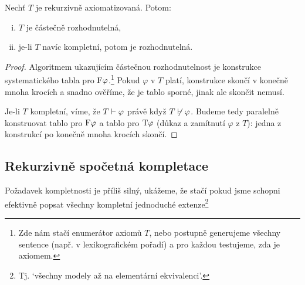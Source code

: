 \begin{proposition}
    Nechť $T$ je rekurzivně axiomatizovaná. Potom:
    \begin{enumerate}[(i)]
        \item $T$ je částečně rozhodnutelná,
        \item je-li $T$ navíc kompletní, potom je rozhodnutelná.
    \end{enumerate}
\end{proposition}
\begin{proof}
Algoritmem ukazujícím částečnou rozhodnutelnost je konstrukce systematického tabla pro $\mathrm{F}\varphi$.\footnote{Zde nám stačí enumerátor axiomů $T$, nebo postupně generujeme všechny sentence (např. v lexikografickém pořadí) a pro každou testujeme, zda je axiomem.} Pokud $\varphi$ v $T$ platí, konstrukce skončí v konečně mnoha krocích a snadno ověříme, že je tablo sporné, jinak ale skončit nemusí.

Je-li $T$ kompletní, víme, že $T\vdash\varphi$ právě když $T\not\vdash\varphi$. Budeme tedy paralelně konstruovat tablo pro $\mathrm{F}\varphi$ a tablo pro $\mathrm{T}\varphi$ (důkaz a zamítnutí $\varphi$ z $T$): jedna z konstrukcí po konečně mnoha krocích skončí.
\end{proof}


\subsection{Rekurzivně spočetná kompletace}

Požadavek kompletnosti je příliš silný, ukážeme, že stačí pokud jsme schopni efektivně popsat všechny kompletní jednoduché extenze\footnote{Tj. `všechny modely až na elementární ekvivalenci'.}

\todo

